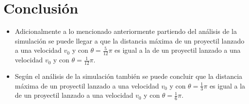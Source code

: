 \section{Conclusión}
\label{sec:conclusion}

\begin{itemize}
    \item Adicionalmente a lo mencionado anteriormente partiendo del análisis
        de la simulación se puede llegar a que la distancia máxima de un
        proyectil lanzado a una velocidad \(v_0\) y con \(\theta =
        \frac{5}{12}\pi \) es igual a la de un proyectil lanzado a una
        velocidad \(v_0\) y con \(\theta = \frac{1}{12}\pi\).
    \item Según el análisis de la simulación también se puede concluir que la
        distancia máxima de un proyectil lanzado a una velocidad \(v_0\) y con
        \(\theta = \frac{1}{3}\pi \) es igual a la de un proyectil lanzado a
        una velocidad \(v_0\) y con \(\theta = \frac{1}{6}\pi\).
\end{itemize}



